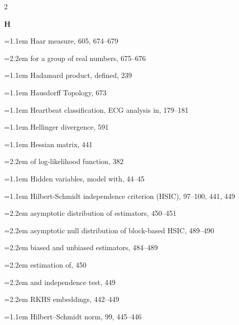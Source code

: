 \begin{multicols}{2}
\par{}\medskip\noindent\textbf{H}\par\nobreak\smallskip\nobreak
\noindent\hangindent=1.1em Haar measure, 605, 674--679\par
\noindent\hangindent=2.2em \hspace*{1.1em}for a group of real numbers, 675--676\par
\noindent\hangindent=1.1em Hadamard product, defined, 239\par
\noindent\hangindent=1.1em Hausdorff Topology, 673\par
\noindent\hangindent=1.1em Heartbeat classification, ECG analysis in, 179--181\par
\noindent\hangindent=1.1em Hellinger divergence, 591\par
\noindent\hangindent=1.1em Hessian matrix, 441\par
\noindent\hangindent=2.2em \hspace*{1.1em}of log-likelihood function, 382\par
\noindent\hangindent=1.1em Hidden variables, model with, 44--45\par
\noindent\hangindent=1.1em Hilbert-Schmidt independence criterion (HSIC), 97--100, 441, 449\par
\noindent\hangindent=2.2em \hspace*{1.1em}asymptotic distribution of estimators, 450--451\par
\noindent\hangindent=2.2em \hspace*{1.1em}asymptotic null distribution of block-based HSIC, 489--490\par
\noindent\hangindent=2.2em \hspace*{1.1em}biased and unbiased estimators, 484--489\par
\noindent\hangindent=2.2em \hspace*{1.1em}estimation of, 450\par
\noindent\hangindent=2.2em \hspace*{1.1em}and independence test, 449\par
\noindent\hangindent=2.2em \hspace*{1.1em}RKHS embeddings, 442--449\par
\noindent\hangindent=1.1em Hilbert--Schmidt norm, 99, 445--446\par

\end{multicols}
